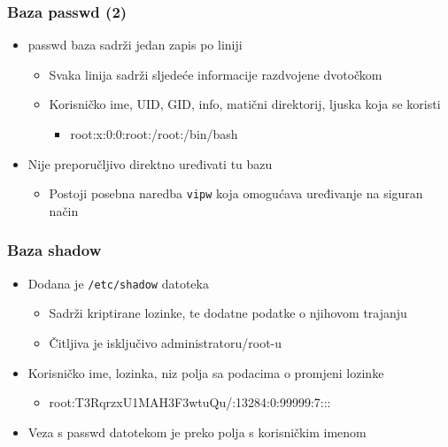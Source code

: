 \documentclass{beamer}
\newcommand{\shell}[1]{\texttt{#1}}
\begin{document}
\begin{frame}[t]
\frametitle{Baza passwd (2)} 
\begin{itemize}
  \item passwd baza sadrži jedan zapis po liniji
  \begin{itemize}
    \item Svaka linija sadrži sljedeće informacije razdvojene dvotočkom
    \item Korisničko ime, UID, GID, info, matični direktorij,
          ljuska koja se koristi
    \begin{itemize}
      \item[] root:x:0:0:root:/root:/bin/bash
    \end{itemize}
  \end{itemize}
  \item Nije preporučljivo direktno uređivati tu bazu
  \begin{itemize}
    \item Postoji posebna naredba \shell{vipw} koja omogućava uređivanje na
          siguran način
  \end{itemize}
\end{itemize}
\end{frame}
    
\begin{frame}[t]
\frametitle{Baza shadow}
\begin{itemize}
  \item Dodana je \shell{/etc/shadow} datoteka
  \begin{itemize}
    \item Sadrži kriptirane lozinke, te dodatne podatke o njihovom trajanju
    \item Čitljiva je isključivo administratoru/root-u
  \end{itemize}
  \item Korisničko ime, lozinka, niz polja sa podacima o promjeni lozinke
  \begin{itemize}
    \item root:T3RqrzxU1MAH3F3wtuQu/:13284:0:99999:7:::
  \end{itemize}
  \item Veza s passwd datotekom je preko polja s korisničkim imenom
\end{itemize}
\end{frame}
\end{document}

